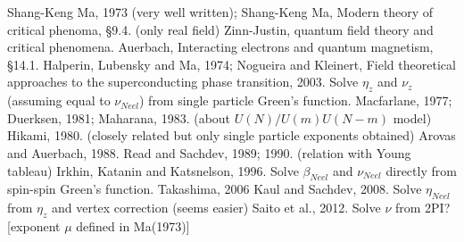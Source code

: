 \documentclass[aps,notitlepage]{revtex4-1}
\begin{document}
\begin{references}
\bibitem{} Shang-Keng Ma, 1973 (very well written); Shang-Keng Ma, Modern theory of critical phenoma, \S9.4. (only real field)
\bibitem{} Zinn-Justin, quantum field theory and critical phenomena.
\bibitem{} Auerbach, Interacting electrons and quantum magnetism, \S14.1.
\bibitem{} Halperin, Lubensky and Ma, 1974; Nogueira and Kleinert, Field theoretical approaches to the superconducting phase transition, 2003. Solve $\eta_z$ and $\nu_z$ (assuming equal to $\nu_{Neel}$) from single particle Green's function.
\bibitem{} Macfarlane, 1977; Duerksen, 1981; Maharana, 1983. (about $U(N)/U(m)U(N-m)$ model)
\bibitem{} Hikami, 1980. (closely related but only single particle exponents obtained)
\bibitem{} Arovas and Auerbach, 1988.
\bibitem{} Read and Sachdev, 1989; 1990. (relation with Young tableau)
\bibitem{} Irkhin, Katanin and Katsnelson, 1996. Solve $\beta_{Neel}$ and $\nu_{Neel}$ directly from spin-spin Green's function.
\bibitem{} Takashima, 2006
\bibitem{} Kaul and Sachdev, 2008. Solve $\eta_{Neel}$ from $\eta_z$ and vertex correction (seems easier)
\bibitem{} Saito et al., 2012. Solve $\nu$ from 2PI? [exponent $\mu$ defined in Ma(1973)]
\end{references}
%
\end{document}
